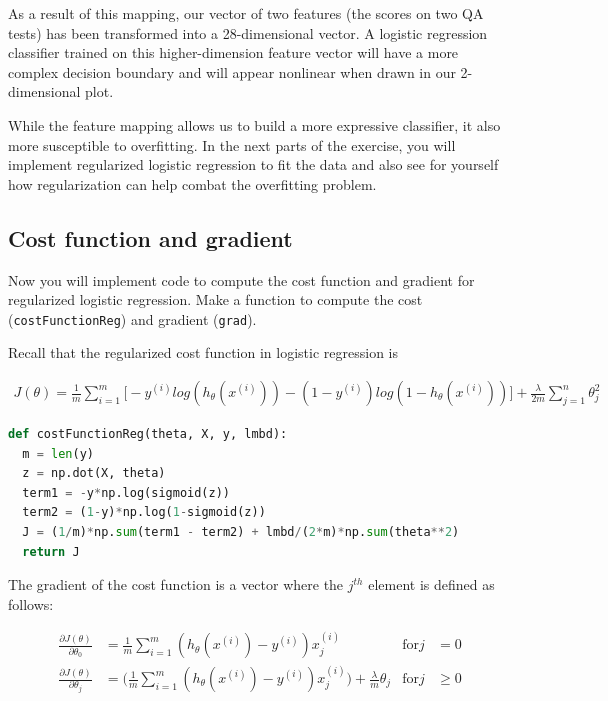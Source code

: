 \documentclass[12pt]{article}
\begin{document}
As a result of this mapping, our vector of two features (the scores on two QA tests) has been transformed into a 28-dimensional vector. A logistic regression classifier trained on this higher-dimension feature vector will have
a more complex decision boundary and will appear nonlinear when drawn in our 2-dimensional plot.

While the feature mapping allows us to build a more expressive classifier, it also more susceptible to overfitting. In the next parts of the exercise, you will implement regularized logistic regression to fit the data and also see for yourself how regularization can help combat the overfitting problem.


\subsection{Cost function and gradient} \label{val:costawal}

Now you will implement code to compute the cost function and gradient for regularized logistic regression. Make a function to compute the cost (\texttt{costFunctionReg}) and gradient (\texttt{grad}). 

Recall that the regularized cost function in logistic regression is

\begin{align}
  J(\theta) = \frac{1}{m}\sum_{i=1}^m{\big[-y^{(i)}log(h_\theta(x^{(i)}))-(1-y^{(i)})log(1-h_\theta(x^{(i)}))\big]} + \frac{\lambda}{2m}\sum_{j=1}^n{\theta_j^2}
\end{align}

\begin{lstlisting}[language=Python]
  def costFunctionReg(theta, X, y, lmbd):
  m = len(y)
  z = np.dot(X, theta)
  term1 = -y*np.log(sigmoid(z))
  term2 = (1-y)*np.log(1-sigmoid(z))
  J = (1/m)*np.sum(term1 - term2) + lmbd/(2*m)*np.sum(theta**2)
  return J
\end{lstlisting}

The gradient of the cost function is a vector where the $j^{th}$ element is defined as follows:

\begin{align}
  \frac{\partial J(\theta)}{\partial \theta_0} & = \frac{1}{m}\sum_{i=1}^m{(h_\theta(x^{(i)})-y^{(i)}) x_j^{(i)}} & \text{for} j & = 0 \\
  \frac{\partial J(\theta)}{\partial \theta_j} & = \bigg(\frac{1}{m}\sum_{i=1}^m{(h_\theta(x^{(i)})-y^{(i)}) x_j^{(i)}}\bigg) + \frac{\lambda}{m}\theta_j & \text{for} j & \geq 0
\end{align}
\end{document}
